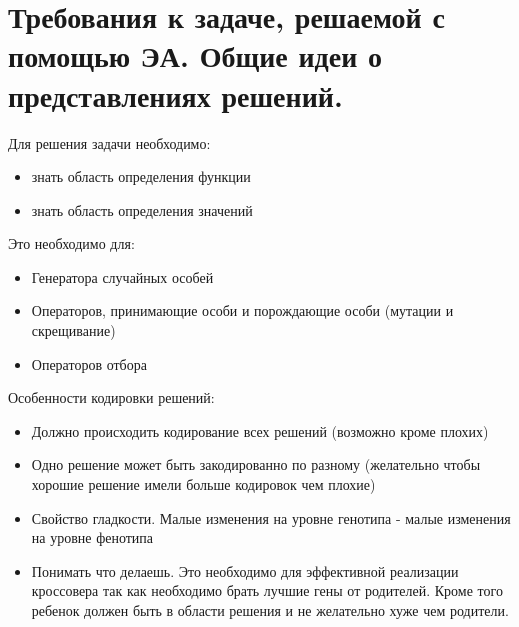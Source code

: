 \section{Требования к задаче, решаемой с помощью ЭА. Общие идеи о представлениях решений.}
Для решения задачи необходимо:
\begin{itemize}
	\item знать область определения функции
	\item знать область определения значений
\end{itemize}
Это необходимо для:
\begin{itemize}
	\item Генератора случайных особей
	\item Операторов, принимающие особи и порождающие особи (мутации и скрещивание)
	\item Операторов отбора
\end{itemize}
Особенности кодировки решений:
\begin{itemize}
	\item Должно происходить кодирование всех решений (возможно кроме плохих)
	\item Одно решение может быть закодированно по разному (желательно чтобы хорошие решение имели больше кодировок чем плохие)
	\item Свойство гладкости. Малые изменения на уровне генотипа - малые изменения на уровне фенотипа
	\item Понимать что делаешь. Это необходимо для эффективной реализации кроссовера так как необходимо брать лучшие гены от родителей. Кроме того ребенок должен быть в области решения и не желательно хуже чем родители. 
\end{itemize}